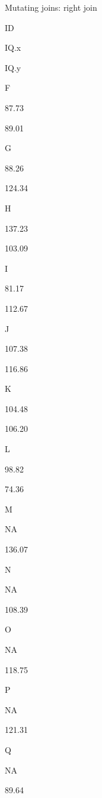 \documentclass[ignorenonframetext,]{beamer}
\newenvironment{Shaded}{\begin{snugshade}}{\end{snugshade}}
\newcommand{\KeywordTok}[1]{\textcolor[rgb]{0.13,0.29,0.53}{\textbf{#1}}}
\newcommand{\DataTypeTok}[1]{\textcolor[rgb]{0.13,0.29,0.53}{#1}}
\newcommand{\DecValTok}[1]{\textcolor[rgb]{0.00,0.00,0.81}{#1}}
\newcommand{\StringTok}[1]{\textcolor[rgb]{0.31,0.60,0.02}{#1}}
\newcommand{\OperatorTok}[1]{\textcolor[rgb]{0.81,0.36,0.00}{\textbf{#1}}}
\newcommand{\NormalTok}[1]{#1}
\begin{document}
\begin{frame}[fragile]{Mutating joins: right join}

\begin{Shaded}
\end{Shaded}

ID

IQ.x

IQ.y

F

87.73

89.01

G

88.26

124.34

H

137.23

103.09

I

81.17

112.67

J

107.38

116.86

K

104.48

106.20

L

98.82

74.36

M

NA

136.07

N

NA

108.39

O

NA

118.75

P

NA

121.31

Q

NA

89.64

\end{frame}
\end{document}
